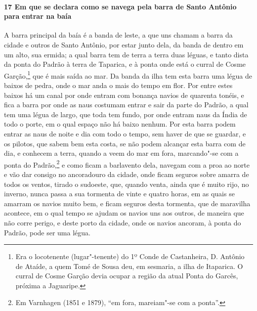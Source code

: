 \begin{linenumbers}
\paragraph{17 Em que se declara como se navega pela barra de Santo Antônio para entrar na
baía} \quad
A barra principal da baía é a banda de leste, a que uns chamam a barra da cidade e
outros de Santo Antônio, por estar junto dela, da banda de dentro em um alto, sua ermida;
a qual barra tem de terra a terra duas léguas, e tanto dista da ponta do Padrão à terra de
Taparica, e à ponta onde está o curral de Cosme Garção,\footnote{ Era o locotenente
(lugar"-tenente) do 1º Conde de Castanheira, D. Antônio de Ataíde, a quem Tomé de Sousa
deu, em sesmaria, a ilha de Itaparica. O curral de Cosme Garção devia ocupar a região da
atual Ponta do Garcês, próxima a Jaguaripe.} que é mais saída ao mar. Da banda da ilha tem
esta barra uma légua de baixos de pedra, onde o mar anda o mais do tempo em flor. Por
entre estes baixos há um canal por onde entram com bonança navios de quarenta tonéis, e
fica a barra por onde as naus costumam entrar e sair da parte do Padrão, a qual tem uma
légua de largo, que toda tem fundo, por onde entram naus da Índia de todo o porte, em o
qual espaço não há baixo nenhum. Por esta barra podem entrar as naus de noite e dia com
todo o tempo, sem haver de que se guardar, e os pilotos, que sabem bem esta costa, se não
podem alcançar esta barra com de dia, e conhecem a terra, quando a veem do mar em fora,
marcando"-se com a ponta do Padrão,\footnote{ Em Varnhagen (1851 e 1879), ``em fora,
mareiam"-se com a ponta''.} e como ficam a barlavento dela, navegam com a proa ao norte e
vão dar consigo no ancoradouro da cidade, onde ficam seguros sobre amarra de todos os
ventos, tirado o sudoeste, que, quando venta, ainda que é muito rijo, no inverno,
nunca passa a sua tormenta de vinte e quatro horas, em as quais se
amarram os navios muito bem, e ficam seguros desta tormenta, que de maravilha acontece, em
o qual tempo se ajudam os navios uns aos outros, de maneira que não corre perigo, e deste
porto da cidade, onde os navios ancoram, à ponta do Padrão, pode ser uma légua.


\end{linenumbers}
